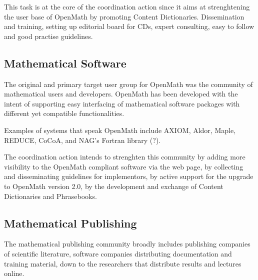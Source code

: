\documentclass[draft]{artikel3}
\begin{document}
This task is at the core of the coordination action since it aims at
strenghtening the user base of OpenMath by promoting Content
Dictionaries. Dissemination and training, setting up editorial board
for CDs, expert consulting, easy to follow and good practise
guidelines.





\subsection{Mathematical Software}
\label{sec:msw}

The original and primary target user group for OpenMath was the
community of mathematical users and developers. OpenMath has been
developed with the intent of supporting easy interfacing of
mathematical software packages with different yet compatible
functionalities. 

Examples of systems that speak OpenMath include AXIOM, Aldor, Maple,
REDUCE, CoCoA, and NAG's Fortran library (?).

The coordination action intends to strenghten this community by adding
more visibility to the OpenMath compliant software via the web page,
by collecting and disseminating guidelines for implementors, by active
support for the upgrade to OpenMath version 2.0, by the development
and exchange of Content Dictionaries and Phrasebooks.

\subsection{Mathematical Publishing}
\label{sec:mpubl}

The mathematical publishing community broadly includes publishing
companies of scientific literature, software companies distributing
documentation and training material, down to the researchers that
distribute results and lectures online.
\end{document}
